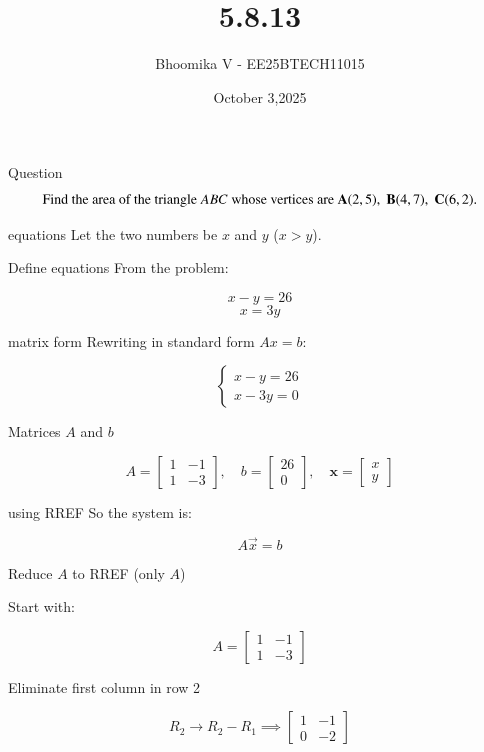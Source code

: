 \documentclass{beamer}
\begin{document}
\title 
{5.8.13}
\date{October 3,2025}


\author 
{Bhoomika V - EE25BTECH11015}




\frame{\titlepage}
\begin{frame}{Question}
\[
\text{Find the area of the triangle } ABC \text{ whose vertices are }\\ \\
\vec{A}(2,5),\; \vec{B}(4,7),\; \vec{C}(6,2).
\]
\end{frame}

\begin{frame}{equations}
Let the two numbers be $x$ and $y$ ($x > y$).

 Define equations
From the problem:

\[
x - y = 26
\]
\[
x = 3y
\]
\end{frame}

\begin{frame}{matrix form}
Rewriting in standard form $Ax = b$:

\[
\begin{cases}
x - y = 26 \\
x - 3y = 0
\end{cases}
\]


 Matrices $A$ and $b$

\[
A = 
\begin{bmatrix}
1 & -1 \\
1 & -3
\end{bmatrix}, 
\quad
b = 
\begin{bmatrix}
26 \\
0
\end{bmatrix}, 
\quad
\mathbf{x} = 
\begin{bmatrix}
x \\ y
\end{bmatrix}
\]
\end{frame}

\begin{frame}{using RREF}
So the system is:

\[
A \vec{x} = b
\]

 Reduce $A$ to RREF (only $A$)

Start with:

\[
A = 
\begin{bmatrix}
1 & -1 \\
1 & -3
\end{bmatrix}
\]

Eliminate first column in row 2

\[
R_2 \to R_2 - R_1 \implies 
\begin{bmatrix}
1 & -1 \\
0 & -2
\end{bmatrix}
\]


\end{frame}
\end{document}
